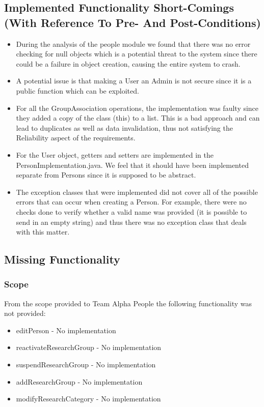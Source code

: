\documentclass{article}
\begin{document}
    \subsection{Implemented Functionality Short-Comings (With Reference To Pre- And Post-Conditions)}
	\begin{itemize}
	
	    \item During the analysis of the people module we found that there was no error checking for null objects which is a potential threat to the system since there could be a failure in object creation, causing the entire system to crash.
	    \item A potential issue is that making a User an Admin is not secure since it is a public function which can be exploited.
	    \item For all the GroupAssociation operations, the implementation was faulty since they added a copy of the class (this) to a list. This is a bad approach and can lead to duplicates as well as data invalidation, thus not satisfying the Reliability aspect of the requirements.
	    \item For the User object, getters and setters are implemented in the PersonImplementation.java. We feel that it should have been implemented separate from Persons since it is supposed to be abstract. 
	    \item The exception classes that were implemented did not cover all of the possible errors that can occur when creating a Person. For example, there were no checks done to verify whether a valid name was provided (it is possible to send in an empty string) and thus there was no exception class that deals with this matter.
	\end{itemize}

    \subsection{Missing Functionality}
	\subsubsection{Scope}
	From the scope provided to Team Alpha People the following functionality was not provided:
	\begin{itemize}
		\item editPerson - No implementation
		\item reactivateResearchGroup - No implementation
		\item suspendResearchGroup - No implementation
		\item addResearchGroup - No implementation
		\item modifyResearchCategory - No implementation
	\end{itemize}
	
\end{document}
